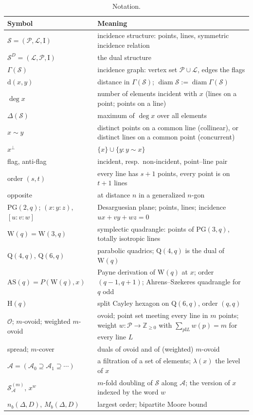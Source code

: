 \documentclass[11pt]{amsart}
\theoremstyle{definition}
\theoremstyle{remark}
\newcommand{\cS}{\mathcal{S}}
\newcommand{\cP}{\mathcal{P}}
\newcommand{\cL}{\mathcal{L}}
\newcommand{\cA}{\mathcal{A}}
\newcommand{\cO}{\mathcal{O}}
\newcommand{\I}{\mathrel{\mathrm{I}}}
\newcommand{\PG}{\mathrm{PG}}
\newcommand{\Hq}{\mathrm{H}}
\newcommand{\AS}{\mathrm{AS}}
\newcommand{\Wq}{\mathrm{W}}
\newcommand{\Qf}{\mathrm{Q}}
\newcommand{\dd}{\mathrm{d}}
\newcommand{\diam}{\operatorname{diam}}
\newcommand{\pnt}[3]{({#1}{:}{#2}{:}{#3})}
\newcommand{\lin}[3]{[{#1}{:}{#2}{:}{#3}]}
\newcommand{\Dbl}[2]{{#1}^{(#2)}_{\cA}}
\begin{document}
\begin{table}[ht]
\centering\small
\renewcommand{\arraystretch}{1.15}
\begin{tabular}{@{}>{\raggedright}p{}p{}@{}}
\toprule
Symbol & Meaning\\
\midrule
$\cS=(\cP,\cL,\I)$ & incidence structure: points, lines, symmetric incidence relation\\
$\cS^D=(\cL,\cP,\I)$ & the dual structure\\
$\Gamma(\cS)$ & incidence graph: vertex set $\cP\cup\cL$, edges the flags\\
$\dd(x,y)$ & distance in $\Gamma(\cS)$; $\diam\cS:=\diam\Gamma(\cS)$\\
$\deg x$ & number of elements incident with $x$ (lines on a point; points on a line)\\
$\Delta(\cS)$ & maximum of $\deg x$ over all elements\\
$x\sim y$ & distinct points on a common line (collinear), or distinct lines on a common point (concurrent)\\
$x^\perp$ & $\{x\}\cup\{y: y\sim x\}$\\
flag, anti-flag & incident, resp.\ non-incident, point--line pair\\
order $(s,t)$ & every line has $s+1$ points, every point is on $t+1$ lines\\
opposite & at distance $n$ in a generalized $n$-gon\\
$\PG(2,q)$; $\pnt xyz$, $\lin uvw$ & Desarguesian plane; points, lines; incidence $ux+vy+wz=0$\\
$\Wq(q)=\Wq(3,q)$ & symplectic quadrangle: points of $\PG(3,q)$, totally isotropic lines\\
$\Qf(4,q)$, $\Qf(6,q)$ & parabolic quadrics; $\Qf(4,q)$ is the dual of $\Wq(q)$\\
$\AS(q)=P(\Wq(q),x)$ & Payne derivation of $\Wq(q)$ at $x$; order $(q-1,q+1)$; Ahrens--Szekeres quadrangle for $q$ odd\\
$\Hq(q)$ & split Cayley hexagon on $\Qf(6,q)$, order $(q,q)$\\
$\cO$; $m$-ovoid; weighted $m$-ovoid & ovoid; point set meeting every line in $m$ points; weight $w\colon\cP\to\mathbb Z_{\ge0}$ with $\sum_{p\I L}w(p)=m$ for every line $L$\\
spread; $m$-cover & duals of ovoid and of (weighted) $m$-ovoid\\
$\cA=(\cA_0\supseteq\cA_1\supseteq\cdots)$ & a filtration of a set of elements; $\lambda(x)$ the level of $x$\\
$\Dbl{\cS}{m}$, $x^w$ & $m$-fold doubling of $\cS$ along $\cA$; the version of $x$ indexed by the word $w$\\
$n_b(\Delta,D)$, $M_b(\Delta,D)$ & largest order; bipartite Moore bound\\
\bottomrule
\end{tabular}
\caption{Notation.}\label{tab:notation}
\end{table}
\end{document}
